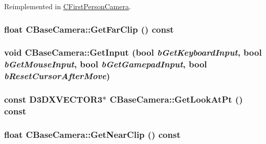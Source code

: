 Reimplemented in \hyperlink{class_c_first_person_camera_a0191f784e950825ac77825ef5c3b6295}{CFirstPersonCamera}.\hypertarget{class_c_base_camera_a381de0e1f449208b1c2cb86e462c8643}{
\subsubsection[{GetFarClip}]{\setlength{\rightskip}{0pt plus 5cm}float CBaseCamera::GetFarClip () const}}
\label{class_c_base_camera_a381de0e1f449208b1c2cb86e462c8643}
\hypertarget{class_c_base_camera_ac0f6595e3bddfd13d620f5a38598192b}{
\subsubsection[{GetInput}]{\setlength{\rightskip}{0pt plus 5cm}void CBaseCamera::GetInput (bool {\em bGetKeyboardInput}, \/  bool {\em bGetMouseInput}, \/  bool {\em bGetGamepadInput}, \/  bool {\em bResetCursorAfterMove})}}
\label{class_c_base_camera_ac0f6595e3bddfd13d620f5a38598192b}
\hypertarget{class_c_base_camera_a9b4df40fa4654c10205d15ff79376e77}{
\subsubsection[{GetLookAtPt}]{\setlength{\rightskip}{0pt plus 5cm}const D3DXVECTOR3$\ast$ CBaseCamera::GetLookAtPt () const}}
\label{class_c_base_camera_a9b4df40fa4654c10205d15ff79376e77}
\hypertarget{class_c_base_camera_ab99c79000b2d4fbf59c181032bccb95d}{
\subsubsection[{GetNearClip}]{\setlength{\rightskip}{0pt plus 5cm}float CBaseCamera::GetNearClip () const}}

